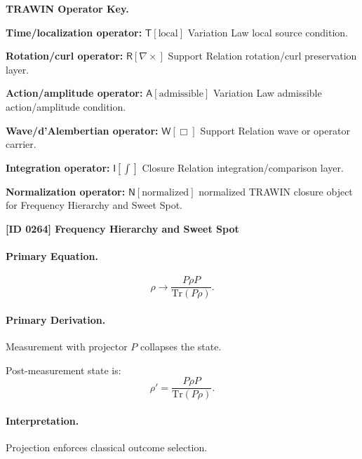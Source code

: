 \par\vspace{0.45\baselineskip}
\noindent\begin{minipage}[t]{\linewidth}
\begingroup
\small
\raggedright
\textbf{TRAWIN Operator Key.}\par
\noindent\textbf{Time/localization operator:} $\mathsf{T}\!\left[\mathrm{local}\right]$ Variation Law local source condition.\par
\noindent\textbf{Rotation/curl operator:} $\mathsf{R}\!\left[\nabla\times\right]$ Support Relation rotation/curl preservation layer.\par
\noindent\textbf{Action/amplitude operator:} $\mathsf{A}\!\left[\mathrm{admissible}\right]$ Variation Law admissible action/amplitude condition.\par
\noindent\textbf{Wave/d'Alembertian operator:} $\mathsf{W}\!\left[\Box\right]$ Support Relation wave or operator carrier.\par
\noindent\textbf{Integration operator:} $\mathsf{I}\!\left[\int\right]$ Closure Relation integration/comparison layer.\par
\noindent\textbf{Normalization operator:} $\mathsf{N}\!\left[\mathrm{normalized}\right]$ normalized TRAWIN closure object for Frequency Hierarchy and Sweet Spot.\par
\endgroup
\end{minipage}

\clearpage
\noindent\textbf{[ID 0264] Frequency Hierarchy and Sweet Spot}\par
\vspace{0.35em}
\paragraph{Primary Equation.}
\begin{equation}
\rho \rightarrow \frac{P \rho P}{\mathrm{Tr}(P\rho)}.
\end{equation}

\paragraph{Primary Derivation.}
Measurement with projector $P$ collapses the state.

Post-measurement state is:
\begin{equation}
\rho' = \frac{P \rho P}{\mathrm{Tr}(P\rho)}.
\end{equation}

\paragraph{Interpretation.}
Projection enforces classical outcome selection.

